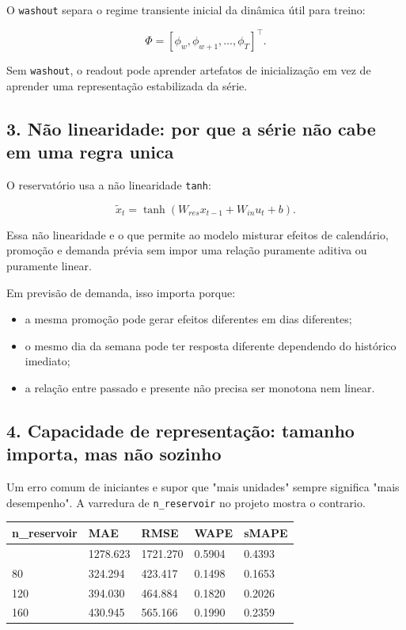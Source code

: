 \documentclass[12pt]{article}
\providecommand{\tightlist}{%
          \setlength{\itemsep}{0pt}\setlength{\parskip}{0pt}}
\begin{document}
O \texttt{washout} separa o regime transiente inicial da dinâmica útil para treino:

\[
\Phi = [\phi_w, \phi_{w+1}, \dots, \phi_T]^\top.
\]

Sem \texttt{washout}, o readout pode aprender artefatos de inicialização em vez de aprender uma representação estabilizada da série.

\subsection{3. Não linearidade: por que a série não cabe em uma regra unica}\label{3-nuxe3o-linearidade-por-que-a-suxe9rie-nuxe3o-cabe-em-uma-regra-unica}

O reservatório usa a não linearidade \texttt{tanh}:

\[
\widetilde{x}_t = \tanh(W_{res} x_{t-1} + W_{in} u_t + b).
\]

Essa não linearidade e o que permite ao modelo misturar efeitos de calendário, promoção e demanda prévia sem impor uma relação puramente aditiva ou puramente linear.

Em previsão de demanda, isso importa porque:

\begin{itemize}
\tightlist
\item
  a mesma promoção pode gerar efeitos diferentes em dias diferentes;
\item
  o mesmo dia da semana pode ter resposta diferente dependendo do histórico imediato;
\item
  a relação entre passado e presente não precisa ser monotona nem linear.
\end{itemize}

\subsection{4. Capacidade de representação: tamanho importa, mas não sozinho}\label{4-capacidade-de-representauxe7uxe3o-tamanho-importa-mas-nuxe3o-sozinho}

Um erro comum de iniciantes e supor que "mais unidades" sempre significa "mais desempenho". A varredura de \texttt{n\_reservoir} no projeto mostra o contrario.

\begin{longtable}[]{@{}lllll@{}}
\toprule\noalign{}
n\_reservoir & MAE & RMSE & WAPE & sMAPE \\
\midrule\noalign{}
\endhead
\bottomrule\noalign{}
\endlastfoot
40 & 1278.623 & 1721.270 & 0.5904 & 0.4393 \\
80 & 324.294 & 423.417 & 0.1498 & 0.1653 \\
120 & 394.030 & 464.884 & 0.1820 & 0.2026 \\
160 & 430.945 & 565.166 & 0.1990 & 0.2359 \\
\end{longtable}
\end{document}
